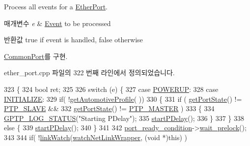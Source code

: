 Process all events for a \hyperlink{class_ether_port}{Ether\+Port}. 


\begin{DoxyParams}{매개변수}
{\em e} & \hyperlink{class_event}{Event} to be processed \\
\hline
\end{DoxyParams}
\begin{DoxyReturn}{반환값}
true if event is handled, false otherwise 
\end{DoxyReturn}


\hyperlink{class_common_port_a8fdf705ad3f9d8794555fe1c611c19ec}{Common\+Port}를 구현.



ether\+\_\+port.\+cpp 파일의 322 번째 라인에서 정의되었습니다.


\begin{DoxyCode}
323 \{
324     \textcolor{keywordtype}{bool} ret;
325 
326     \textcolor{keywordflow}{switch} (e) \{
327     \textcolor{keywordflow}{case} \hyperlink{ieee1588_8hpp_a5667b805d857c6d28f83f6038a0272d3a406cd6aebc015d1776ef6cf24aa6ec76}{POWERUP}:
328     \textcolor{keywordflow}{case} \hyperlink{ieee1588_8hpp_a5667b805d857c6d28f83f6038a0272d3ab0c48e95b68bff1f7820e23b8fd0bc98}{INITIALIZE}:
329         \textcolor{keywordflow}{if}( !\hyperlink{class_common_port_ad8dc4b5a985b466538d6805970eb0176}{getAutomotiveProfile}( ))
330         \{
331             \textcolor{keywordflow}{if} ( \hyperlink{class_common_port_aa4182d914fdb9a27fb875d8495e0289c}{getPortState}() != \hyperlink{ptptypes_8hpp_a679431f1afc75d7bb9e972c022e53672a55a1a2eb4b93c65e3bba86278510cb04}{PTP\_SLAVE} &&
332                  \hyperlink{class_common_port_aa4182d914fdb9a27fb875d8495e0289c}{getPortState}() != \hyperlink{ptptypes_8hpp_a679431f1afc75d7bb9e972c022e53672ab4c763cac238b6403615a62111b64aa4}{PTP\_MASTER} )
333             \{
334                 \hyperlink{gptp__log_8hpp_a9bcf107d6f77d335b92bbc4825ea85a3}{GPTP\_LOG\_STATUS}(\textcolor{stringliteral}{"Starting PDelay"});
335                 \hyperlink{class_ether_port_ab099720a7511dbef4546f70e5e3b1075}{startPDelay}();
336             \}
337         \}
338         \textcolor{keywordflow}{else} \{
339             \hyperlink{class_ether_port_ab099720a7511dbef4546f70e5e3b1075}{startPDelay}();
340         \}
341 
342         \hyperlink{class_ether_port_af34f0a0361d75a05cfe798511931cf1b}{port\_ready\_condition}->\hyperlink{class_o_s_condition_a0163ca19d705a3e7f3ee4ba38226ab24}{wait\_prelock}();
343 
344         \textcolor{keywordflow}{if}( !\hyperlink{class_common_port_a2e924d1664a7395f8f7afb21107e0f21}{linkWatch}(\hyperlink{ether__port_8cpp_ad626865f86a1442bd52c41be32ae1876}{watchNetLinkWrapper}, (\textcolor{keywordtype}{void} *)\textcolor{keyword}{this}) )

\end{DoxyCode}
